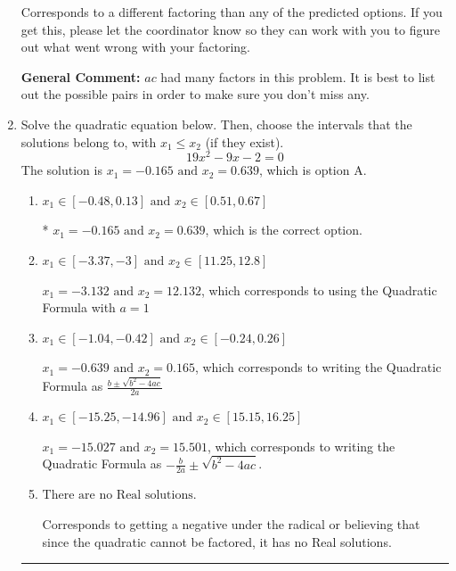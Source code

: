\documentclass{extbook}[14pt]
\newcommand{\litem}[1]{\item #1

\rule{\textwidth}{0.4pt}}
\begin{document}
\begin{enumerate}
{\begin{enumerate}[label=\Alph*.]
 Corresponds to a different factoring than any of the predicted options. If you get this, please let the coordinator know so they can work with you to figure out what went wrong with your factoring.
\end{enumerate}

\textbf{General Comment:} $ac$ had many factors in this problem. It is best to list out the possible pairs in order to make sure you don't miss any.
}
\litem{
Solve the quadratic equation below. Then, choose the intervals that the solutions belong to, with $x_1 \leq x_2$ (if they exist).
\[ 19x^{2} -9 x -2 = 0 \]The solution is \( x_1 = -0.165 \text{ and } x_2 = 0.639 \), which is option A.\begin{enumerate}[label=\Alph*.]
\item \( x_1 \in [-0.48, 0.13] \text{ and } x_2 \in [0.51, 0.67] \)

* $x_1 = -0.165 \text{ and } x_2 = 0.639$, which is the correct option.
\item \( x_1 \in [-3.37, -3] \text{ and } x_2 \in [11.25, 12.8] \)

 $x_1 = -3.132 \text{ and } x_2 = 12.132$, which corresponds to using the Quadratic Formula with $a=1$
\item \( x_1 \in [-1.04, -0.42] \text{ and } x_2 \in [-0.24, 0.26] \)

 $x_1 = -0.639 \text{ and } x_2 = 0.165$, which corresponds to writing the Quadratic Formula as $\frac{b \pm \sqrt{b^2 - 4ac}}{2a}$
\item \( x_1 \in [-15.25, -14.96] \text{ and } x_2 \in [15.15, 16.25] \)

 $x_1 = -15.027 \text{ and } x_2 = 15.501$, which corresponds to writing the Quadratic Formula as $-\frac{b}{2a} \pm \sqrt{b^2 - 4ac}$.
\item \( \text{There are no Real solutions.} \)

Corresponds to getting a negative under the radical or believing that since the quadratic cannot be factored, it has no Real solutions.
\end{enumerate}

}
\end{enumerate}
\end{document}
